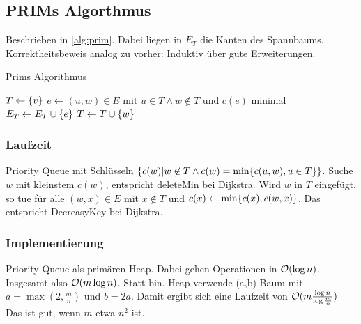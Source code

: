             
    \subsection{PRIMs Algorthmus}
        Beschrieben in \autoref{alg:prim}. Dabei liegen in $E_T$ die Kanten des Spannbaums. Korrektheitsbeweis analog zu vorher: Induktiv über gute Erweiterungen.
    	\begin{algorithm}
        		\caption{Prims Algorithmus}
        		\label{alg:prim}
        		\begin{algorithmic}[1]
        			    \State $T \gets \{v\}$
        				    \State $e \gets (u,w) \in E \text{ mit } u \in T \land w \not \in T \text{ und } c(e) \text{ minimal}$
        				    \State $E_T \gets E_T \cup \{e\}$
        				    \State $T \gets T \cup \{w\}$
        				\EndWhile
        			\EndFunction
        		\end{algorithmic}
        	\end{algorithm}
        
        
        \subsubsection{Laufzeit}
            Priority Queue mit Schlüsseln $\{c(w) | w \not \in T \land c(w) = \min\{c(u,w),u \in T\}\}$. Suche $w$ mit kleinstem $c(w)$, entspricht deleteMin bei Dijkstra. Wird $w$ in $T$ eingefügt, so tue für alle $(w,x) \in E$ mit $x \not \in T$ und $c(x) \leftarrow \min \{c(x), c(w,x)\}$. Das entspricht DecreasyKey bei Dijkstra. 
            
        \subsubsection{Implementierung}
            Priority Queue als primären Heap. Dabei gehen Operationen in $\mathcal{O}(\log n)$. Insgesamt also $\mathcal{O}(m \log n)$. Statt bin. Heap verwende (a,b)-Baum mit $ a = \max(2,\frac{m}{n})$ und $b=2a$. Damit ergibt sich eine Laufzeit von $\mathcal{O}(m \frac{\log n}{\log \frac{m}{n}})$ Das ist gut, wenn $m$ etwa $n^2$ ist.
            
    
        
